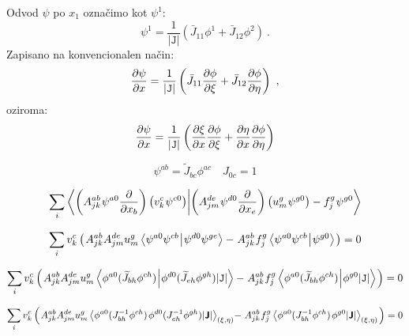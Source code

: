 Odvod $\psi$ po $x_1$ označimo kot $\psi^1$:
\begin{equation}
   \psi^1 = \frac{1}{|\texttt{J}|} \left(\bar{J}_{11} \phi^1 + \bar{J}_{12} \phi^2 \right) \ .
\end{equation}
Zapisano na konvencionalen način:
\begin{equation}
   \frac{\pd \psi}{\pd x} = \frac{1}{|\texttt{J}|} \left(\bar{J}_{11} \frac{\pd \phi}{\pd \xi} + \bar{J}_{12} \frac{\pd \phi}{\pd \eta} \right) \ ,
\end{equation}
oziroma:
\begin{equation}
   \frac{\partial \psi}{\partial x} = \frac{1}{|\texttt{J}|} \left(\frac{\partial \xi}{\partial x} \frac{\partial \phi}{\partial \xi} + \frac{\partial \eta}{\partial x} \frac{\partial \phi}{\partial \eta} \right)
\end{equation}

\begin{equation}
   \psi^{ab} = \widetilde{J}_{bc} \phi^{ac} \quad J_{0c} = 1
\end{equation}

\begin{equation}
   \sum_i \bra{\left(A^{ab}_{jk} \mkern1mu \psi^{a0} \frac{\partial}{\partial x_b}\right) \left(v^c_k \mkern1mu \psi^{c0}\right)}\ket{\left(A^{de}_{jm} \mkern1mu \psi^{d0} \frac{\partial}{\partial x_e}\right) \left(u^g_m \mkern1mu \psi^{g0}\right) - f^g_j \mkern1mu \psi^{g0}}
\end{equation}

\begin{equation}
   \sum_i v^c_k \left( \mkern2mu A^{ab}_{jk} A^{de}_{jm} u^g_m \bra{\psi^{a0} \psi^{cb} \mkern1mu}\ket{\mkern1mu \psi^{d0} \psi^{ge}} - \mkern1mu A^{ab}_{jk} \mkern1mu f^g_j \bra{\psi^{a0} \psi^{cb} \mkern1mu}\ket{\mkern1mu \psi^{g0}} \mkern2mu \right) = 0
\end{equation}

\begin{equation}
   \sum_i v^c_k \left( \mkern2mu A^{ab}_{jk} A^{de}_{jm} u^g_m \bra{\phi^{a0} (\widetilde{J}_{bh}  \phi^{ch}) \mkern1mu}\ket{\mkern1mu \phi^{d0} (\widetilde{J}_{eh}  \phi^{gh}) |\texttt{J}|} - \mkern1mu A^{ab}_{jk} \mkern1mu f^g_j \bra{\phi^{a0} (\widetilde{J}_{bh}  \phi^{ch}) \mkern1mu}\ket{\mkern1mu \phi^{g0} |\texttt{J}|} \mkern2mu \right) = 0
\end{equation}

\begin{equation}
   \sum_i v^c_k \left( \mkern2mu A^{ab}_{jk} A^{de}_{jm} u^g_m \left\langle\phi^{a0} (J^{-1}_{bh}  \phi^{ch}) \mkern1mu\mkern1mu \phi^{d0} (J^{-1}_{eh}  \phi^{gh}) |\bm{\mathsf{J}}|\right\rangle_{(\xi, \eta)} \mkern-4mu - \mkern1mu A^{ab}_{jk} \mkern1mu f^g_j \left\langle\phi^{a0} (J^{-1}_{bh}  \phi^{ch}) \mkern1mu \mkern1mu \phi^{g0} |\bm{\mathsf{J}}|\right\rangle_{(\xi, \eta)} \mkern2mu \right) = 0
\end{equation}

